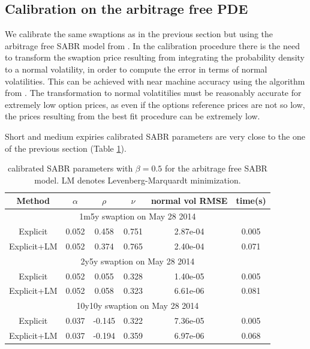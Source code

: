 \documentclass[]{rAMF2e}
\begin{document}
\subsection{Calibration on the arbitrage free PDE}
We calibrate the same swaptions as in the previous section but using the arbitrage free SABR model from \citep{hagan2013arbitrage}. In the calibration procedure there is the need to transform the swaption price resulting from integrating the probability density to a normal volatility, in order to compute the error in terms of normal volatilities. This can be achieved with near machine accuracy using the algorithm from \citep{lefloch2014bpvol}. The transformation to normal volatitilies must be reasonably accurate for extremely low option prices, as even if the options reference prices are not so low, the prices resulting from the best fit procedure can be extremely low.

Short and medium expiries calibrated SABR parameters are very close to the one of the previous section (Table \ref{tbl:arbfree_sabr_fit}).
\begin{table}[h]
\begin{center}
\caption{\label{tbl:arbfree_sabr_fit}calibrated SABR parameters with $\beta=0.5$ for the arbitrage free SABR model. LM denotes Levenberg-Marquardt minimization.}
\begin{tabular}{c c c c c c}
\hline
Method & $\alpha$ & $\rho$ &$\nu$ & normal vol RMSE & time(s) \\
\hline
\multicolumn{6}{c}{1m5y swaption on May 28 2014}\\
\hline
Explicit & 0.052 & 0.458 & 0.751 & 2.87e-04 & 0.005 \\
Explicit+LM & 0.052 & 0.374 & 0.765 & 2.40e-04 & 0.071\\
\hline
\multicolumn{6}{c}{2y5y swaption on May 28 2014}\\
\hline
Explicit & 0.052 & 0.055 & 0.328 & 1.40e-05 & 0.005\\
Explicit+LM & 0.052 & 0.058 & 0.323 & 6.61e-06 & 0.081\\
\hline
\multicolumn{6}{c}{10y10y swaption on May 28 2014}\\
\hline
Explicit & 0.037 & -0.145 & 0.322 & 7.36e-05 & 0.005\\
Explicit+LM & 0.037 & -0.194 & 0.359 & 6.97e-06 & 0.068\\
\hline
\end{tabular}
\end{center}
\end{table}
\end{document}
